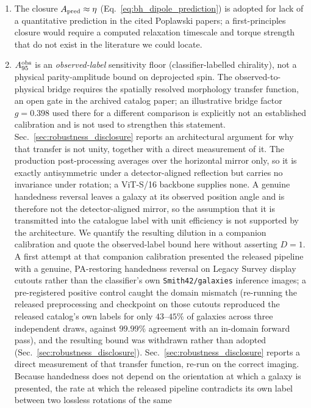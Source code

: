 \documentclass[twocolumn,linenumbers]{aastex702}
\begin{document}
\begin{enumerate}[leftmargin=*,itemsep=1pt]
\item The closure $A_{\rm pred}\approx\eta$ (Eq.~\ref{eq:bh_dipole_prediction})
is adopted for lack of a quantitative prediction in the cited Poplawski
papers; a first-principles closure would require a computed relaxation
timescale and torque strength that do not exist in the literature we could
locate.
\item $A_{95}^{\rm obs}$ is an \emph{observed-label} sensitivity floor
(classifier-labelled chirality), not a physical parity-amplitude bound on
deprojected spin. The observed-to-physical bridge requires the spatially
resolved morphology transfer function, an open gate in the archived catalog
paper; an illustrative bridge factor $g=0.398$ used there for a different
comparison is explicitly not an established calibration and is not used to
strengthen this statement. Sec.~\ref{sec:robustness_disclosure} reports an
architectural argument for why that transfer is not unity, together with a
direct measurement of it.
The production post-processing averages over the horizontal mirror only,
so it is exactly antisymmetric under a detector-aligned reflection but
carries no invariance under rotation; a ViT-S/16 backbone supplies none. A
genuine handedness reversal leaves a galaxy at its observed position angle
and is therefore not the detector-aligned mirror, so the assumption that
it is transmitted into the catalogue label with unit efficiency is not
supported by the architecture. We quantify the resulting dilution in a
companion calibration and quote the observed-label bound here without
asserting $D = 1$. A first attempt at that companion calibration presented
the released pipeline with a genuine, PA-restoring handedness reversal on
Legacy Survey display cutouts rather than the classifier's own
\texttt{Smith42/galaxies} inference images; a pre-registered positive
control caught the domain mismatch (re-running the released preprocessing
and checkpoint on those cutouts reproduced the released catalog's own
labels for only $43$--$45\%$ of galaxies across three independent draws,
against $99.99\%$ agreement with an in-domain forward pass), and the
resulting bound was withdrawn rather than adopted
(Sec.~\ref{sec:robustness_disclosure}). Sec.~\ref{sec:robustness_disclosure}
reports a direct measurement of that transfer function, re-run on the
correct imaging. Because handedness does not depend on the orientation at
which a galaxy is presented, the rate at which the released pipeline
contradicts its own label between two lossless rotations of the same

\end{enumerate}
\end{document}
